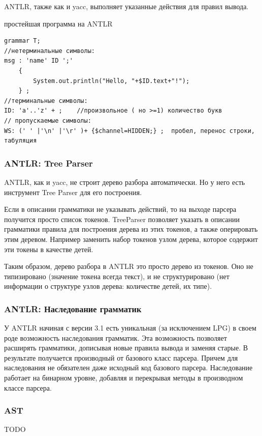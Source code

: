 \documentclass[a4paper,12pt]{article}
\begin{document}
ANTLR, также как и yacc, выполняет указанные действия для правил вывода.

\begin{example}
простейшая программа на ANTLR
\end{example}
\begin{verbatim}
grammar T;
//нетерминальные символы:
msg : 'name' ID ';' 
	{
		System.out.println("Hello, "+$ID.text+"!");
	} ;
//терминальные символы:
ID: 'a'..'z' + ;	//произвольное ( но >=1) количество букв
// пропускаемые символы:
WS: (' ' |'\n' |'\r' )+ {$channel=HIDDEN;} ;  пробел, перенос строки, табуляция
\end{verbatim}

\subsubsection*{ANTLR: Tree Parser}
ANTLR, как и yacc, не строит дерево разбора автоматически. Но у него есть
инструмент Tree Parser для его построения.

Если в описании грамматики не указывать действий, то на выходе парсера получится
просто список токенов. TreeParser позволяет указать в описании грамматики
правила для построения дерева из этих токенов, а также оперировать этим деревом.
Например заменить набор токенов узлом дерева, которое содержит эти токены в
качестве детей.

Таким образом, дерево разбора в ANTLR это просто дерево из токенов. Оно не
типизировано (значение токена всегда текст), и не структурировано (нет
информации о структуре узлов дерева: количестве детей, их типе).

\subsubsection*{ANTLR: Наследование грамматик}
У ANTLR начиная с версии 3.1 есть уникальная (за исключением LPG) в своем роде
возможность наследования грамматик. Эта возможность позволяет расширять
грамматики, дописывая новые правила вывода и заменяя старые. В результате
получается производный от базового класс парсера. Причем для наследования не
обязателен даже исходный код базового парсера. Наследование работает на
бинарном уровне, добавляя и перекрывая методы в производном классе парсера.

\subsubsection*{AST}
TODO
\end{document}
